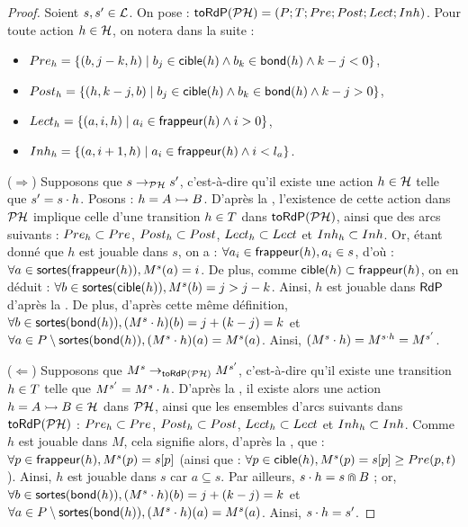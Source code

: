 \begin{proof}
  Soient $s, s' \in \mathcal{L}$.
  On pose : $\mathsf{toRdP}(\mathcal{PH}) = (P; T; Pre; Post; Lect; Inh)$.
  Pour toute action $h \in \mathcal{H}$, on notera dans la suite :
  \begin{itemize}
    \item $Pre_h = \{ (b, j-k, h) \mid b_j \in \mathsf{cible}(h) \wedge
      b_k \in \mathsf{bond}(h) \wedge k-j < 0 \}$,
    \item $Post_h = \{ (h, k-j, b) \mid b_j \in \mathsf{cible}(h) \wedge
      b_k \in \mathsf{bond}(h) \wedge k-j > 0 \}$,
    \item $Lect_h = \{ (a, i, h) \mid a_i \in \mathsf{frappeur}(h) \wedge i > 0 \}$,
    \item $Inh_h = \{ (a, i+1, h) \mid a_i \in \mathsf{frappeur}(h) \wedge i < l_a \}$.
  \end{itemize}
  
  ($\Rightarrow$) Supposons que $s \rightarrow_{\mathcal{PH}} s'$, c'est-à-dire qu'il existe une action $h \in \mathcal{H}$
    telle que $s' = s \cdot h$.
    Posons : $h = \mbox{$A \rightarrowtail B$}$.
    D'après la ,
    l'existence de cette action dans $\mathcal{PH}$ implique celle d'une transition $h \in T$
    dans $\mathsf{toRdP}(\mathcal{PH})$, ainsi que des arcs suivants :
    $Pre_h \subset Pre$, $Post_h \subset Post$,
    $Lect_h \subset Lect$ et $Inh_h \subset Inh$.
    Or, étant donné que $h$ est jouable dans $s$, on a :
    $\forall a_i \in \mathsf{frappeur}(h), a_i \in s$, d'où :
    $\forall a \in \mathsf{sortes}(\mathsf{frappeur}(h)), M^s(a) = i$.
    De plus, comme $\mathsf{cible}(h) \subset \mathsf{frappeur}(h)$, on en déduit :
    $\forall b \in \mathsf{sortes}(\mathsf{cible}(h)), M^s(b) = j > j-k$.
    Ainsi, $h$ est jouable dans $\mathsf{RdP}$ d'après la .
    De plus, d'après cette même définition,
    $\forall b \in \mathsf{sortes}(\mathsf{bond}(h)), (M^s \cdot h)(b) = j + (k - j) = k$
    et $\forall a \in P \setminus \mathsf{sortes}(\mathsf{bond}(h)), (M^s \cdot h)(a) = M^s(a)$.
    Ainsi, $(M^s \cdot h) = M^{s \cdot h} = M^{s'}$.
  
  ($\Leftarrow$) Supposons que $M^s \rightarrow_{\mathsf{toRdP}(\mathcal{PH})} M^{s'}$,
    c'est-à-dire qu'il existe une transition $h \in T$ telle que $M^{s'} = M^s \cdot h$.
    D'après la , il existe alors
    une action $h = \mbox{$A \rightarrowtail B$} \in \mathcal{H}$ dans $\mathcal{PH}$,
    ainsi que les ensembles d'arcs suivants dans $\mathsf{toRdP}(\mathcal{PH})$ :
    $Pre_h \subset Pre$, $Post_h \subset Post$,
    $Lect_h \subset Lect$ et $Inh_h \subset Inh$.
    Comme $h$ est jouable dans $M$, cela signifie alors, d'après la , que :
    $\forall p \in \mathsf{frappeur}(h), M^s(p) = {s[p]}$
    (ainsi que : $\forall p \in \mathsf{cible}(h), M^s(p) = {s[p]} \geq Pre(p, t)$).
    Ainsi, $h$ est jouable dans $s$ car $a \subseteq s$.
    Par ailleurs, $s \cdot h = s \Cap B$ ;
    or, $\forall b \in \mathsf{sortes}(\mathsf{bond}(h)), (M^s \cdot h)(b) = j + (k - j) = k$
    et $\forall a \in P \setminus \mathsf{sortes}(\mathsf{bond}(h)), (M^s \cdot h)(a) = M^s(a)$.
    Ainsi, $s \cdot h = s'$.
\end{proof}

